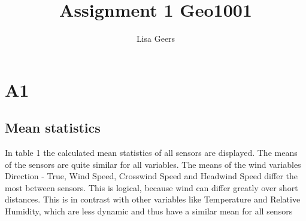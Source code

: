 \documentclass{article}
\title{Assignment 1 Geo1001}
\author{Lisa Geers}
\begin{document}
\maketitle

\section{A1}

    \subsection{Mean statistics}

        In table 1 the calculated mean statistics of all sensors are displayed. The means of the sensors are
        quite similar for all variables. The means of the wind variables Direction - True, Wind Speed, 
        Crosswind Speed and Headwind Speed differ the most between sensors. This is logical, because 
        wind can differ greatly over short distances. This is in contrast with other variables 
        like Temperature and Relative Humidity, which are less dynamic and thus have a similar mean for all 
        sensors
\end{document}
